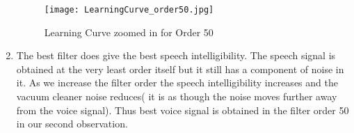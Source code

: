 \documentclass[conference]{IEEEtran}
\begin{document}
\begin{enumerate}
\begin{figure*}
\centering
\texttt{[image: LearningCurve\_order50.jpg]}
\caption{ Learning Curve zoomed in for Order 50}
\label{LearningCurve_zoom_order50}
\end{figure*}


\item The best filter does give the best speech intelligibility. The speech signal is obtained at the very least order itself but it still has a component of noise in it. As we increase the filter order the speech intelligibility increases and the vacuum cleaner noise reduces( it is as though the noise moves further away from the voice signal). Thus best voice signal is obtained in the filter order 50 in our second observation. 

\end{enumerate}


%
%

\end{document}
